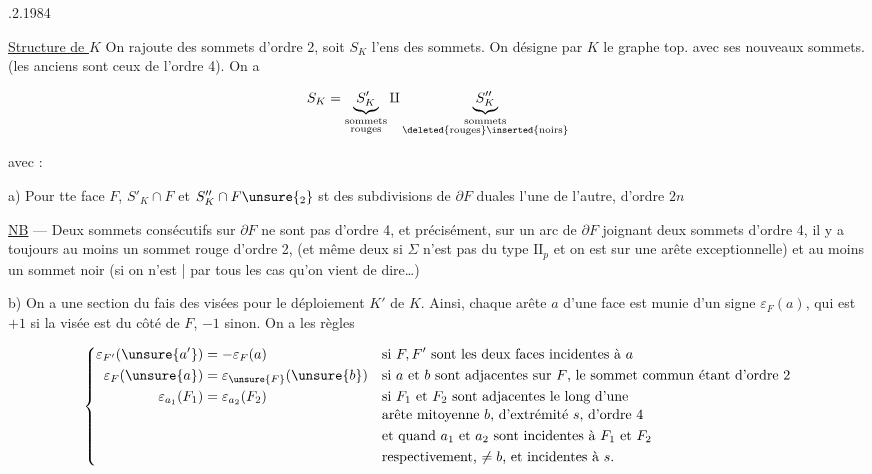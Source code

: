 
.2.1984

\uline{Structure de $K$} On rajoute des sommets d'ordre 2, soit $S_K$ l'ens des sommets. On désigne par $K$ le graphe top. avec ses nouveaux sommets. (les anciens sont ceux de l'ordre 4). On a

\[ S_K=\underbrace{S'_K}_{\substack{\text{sommets}\\\text{rouges}}}\amalg
\underbrace{S''_K}_{\substack{\text{sommets}\\\text{\deleted{rouges}\inserted{noirs}}}} \]


avec :

a) Pour tte  face $F$, $S'_K\cap F$ et $S''_K\cap F\unsure{_2}$ st des subdivisions de $\partial F$ duales l'une de l'autre, d'ordre $2n$

 \uline{NB} --- Deux sommets consécutifs sur $\partial F$ ne sont pas d'ordre 4, et  précisément,  sur un arc de $\partial F$ joignant deux sommets d'ordre 4, il y a toujours au moins un sommet rouge d'ordre 2, (et même deux si $\Sigma$ n'est pas  du type $\mathrm{II}_p$ et on est sur une arête exceptionnelle) et au moins un sommet noir (si on n'est | par tous les cas qu'on vient de dire\ldots)

b)  On a une section du fais des visées pour le déploiement $K'$ de $K$. Ainsi, chaque arête $a$ d'une face  est munie d'un signe $\varepsilon_F(a)$, qui est \deleted{\unsure{$\pm$}}$+1$ si la visée est du côté de $F$, $-1$ sinon. On a les règles

\[
\left\{\begin{aligned}
\varepsilon_{F'}(\unsure{a'})&=-\varepsilon_F(a) &&\text{si $F,F'$ sont les deux faces incidentes à $a$}\\
\varepsilon_F(\unsure{a})&=\varepsilon_{\unsure{F}}(\unsure{b}) &&\text{si $a$ et $b$ sont adjacentes sur $F$, le sommet commun étant d'ordre 2}\\
\varepsilon_{a_1}(F_1)&=\varepsilon_{a_2}(F_2) &&\text{si $F_1$ et $F_2$ sont adjacentes le long d'une}\\[-2pt]
&&&\text{arête mitoyenne $b$, d'extrémité $s$, d'ordre 4}\\
&&&\text{et quand $a_1$ et $a_2$ sont incidentes à $F_1$ et $F_2$}\\
&&&\text{respectivement, $\ne b$, et incidentes à $s$.}
\end{aligned}\right.
\]

